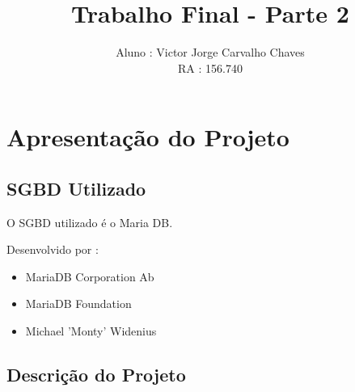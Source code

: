 \documentclass[a4paper,11pt]{article}
\title{Trabalho Final - Parte 2}
\author{Aluno : Victor Jorge Carvalho Chaves \\ RA : 156.740}
\date{}
\begin{document}
\maketitle

\section{Apresentação do Projeto}

\subsection{SGBD Utilizado}

O SGBD utilizado é o Maria DB.

Desenvolvido por :
\begin{itemize}
    \item MariaDB Corporation Ab
    \item MariaDB Foundation
    \item Michael 'Monty' Widenius
\end{itemize}

\subsection{Descrição do Projeto}
\end{document}
